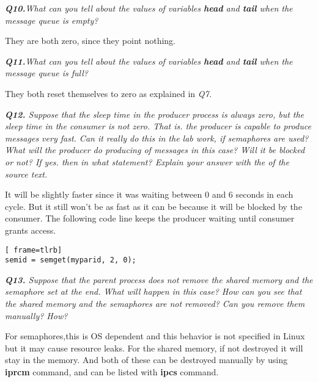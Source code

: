 \documentclass[11pt]{article}
\begin{document}
\vspace{5mm}
\textit{\textbf{Q10.}What can you tell about the values of variables \textbf{ head} and \textbf{ tail} when the message queue is empty?}
\vspace{5mm}

They are both zero, since they point nothing.

\vspace{5mm}
\textit{\textbf{Q11.}What can you tell about the values of variables \textbf{ head} and \textbf{ tail} when the message queue is full?}
\vspace{5mm}

They both reset themselves to zero as explained in \textit{Q7.}

\vspace{5mm}
\textit{\textbf{Q12.} Suppose that the sleep time in the producer process is always zero, but the sleep time in the consumer is not zero. That is. the producer is capable to produce messages very fast. Can it really do this in the lab work, if semaphores are used? What will the producer do producing of messages in this case? Will it be blocked or not? If yes. then in what statement? Explain your answer with the of the source text.}
\vspace{5mm}

It will be slightly faster since it was waiting between 0 and 6 seconds in each cycle. But it still won't be as fast as it can be because it will be blocked by the consumer. The following code line keeps the producer waiting until consumer grants access.

\vspace{5mm}
\begin{minipage}{1\textwidth}
\begin{lstlisting}[ frame=tlrb]
semid = semget(myparid, 2, 0);
\end{lstlisting}
\end{minipage}

\vspace{5mm}
\textit{\textbf{Q13.} Suppose that the parent process does not remove the shared memory and the semaphore set at the end. What will happen in this case? How can you see that the shared memory and the semaphores are not removed? Can you remove them manually? How?}
\vspace{5mm}

For semaphores,this is OS dependent and this behavior is not specified in Linux but it may cause resource leaks. For the shared memory, if not destroyed it will stay in the memory. And both of these can be destroyed manually by using \textbf{iprcm} command, and can be listed with \textbf{ipcs} command.
\end{document}
